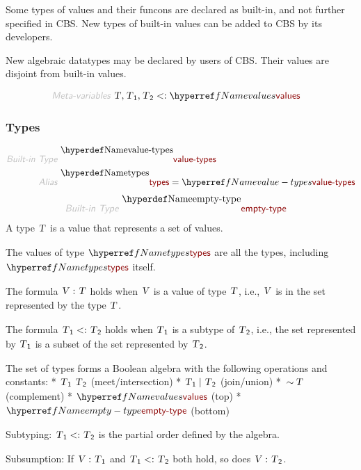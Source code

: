 Some types of values and their funcons are declared as built-in, and not
  further specified in CBS. New types of built-in values can be added to CBS
  by its developers.

New algebraic datatypes may be declared by users of CBS. Their values are
  disjoint from built-in values.

\begin{align*}
  \KEY{Meta-variables} ~ 
  & \VAR{T}, \VAR{T}\SUB{1}, \VAR{T}\SUB{2} <: \NAMEREF{values}
\end{align*}
\subsubsection*{Types}\hypertarget{types}{}\label{types}

\begin{align*}
  \KEY{Built-in Type} ~  
  & \NAMEDECL{value-types} 
\\
  \KEY{Alias} ~ 
  & \NAMEDECL{types} = \NAMEREF{value-types}
\end{align*}
\begin{align*}
  \KEY{Built-in Type} ~  
  & \NAMEDECL{empty-type} 
\end{align*}
A type $\SHADE{\VAR{T}}$ is a value that represents a set of values.

The values of type $\SHADE{\NAMEREF{types}}$ are all the types, including $\SHADE{\NAMEREF{types}}$ itself.

The formula $\SHADE{ \VAR{V} : \VAR{T}}$ holds when $\SHADE{\VAR{V}}$ is a value of type $\SHADE{\VAR{T}}$, i.e., $\SHADE{\VAR{V}}$ is in
  the set represented by the type $\SHADE{\VAR{T}}$.

The formula $\SHADE{\VAR{T}\SUB{1} <: \VAR{T}\SUB{2}}$ holds when $\SHADE{\VAR{T}\SUB{1}}$ is a subtype of $\SHADE{\VAR{T}\SUB{2}}$, i.e., the set
  represented by $\SHADE{\VAR{T}\SUB{1}}$ is a subset of the set represented by $\SHADE{\VAR{T}\SUB{2}}$.

The set of types forms a Boolean algebra with the following operations and
  constants:
    * $\SHADE{\VAR{T}\SUB{1} \ \VAR{T}\SUB{2}}$    (meet/intersection)
    * $\SHADE{\VAR{T}\SUB{1} \mid \VAR{T}\SUB{2}}$    (join/union)
    * $\SHADE{\mathop{\sim} \VAR{T}}$        (complement)
    * $\SHADE{\NAMEREF{values}}$     (top)
    * $\SHADE{\NAMEREF{empty-type}}$ (bottom)

Subtyping: $\SHADE{\VAR{T}\SUB{1} <: \VAR{T}\SUB{2}}$ is the partial order defined by the algebra.

Subsumption: If $\SHADE{ \VAR{V} : \VAR{T}\SUB{1}}$ and $\SHADE{\VAR{T}\SUB{1} <: \VAR{T}\SUB{2}}$ both hold, so does $\SHADE{ \VAR{V} : \VAR{T}\SUB{2}}$.

